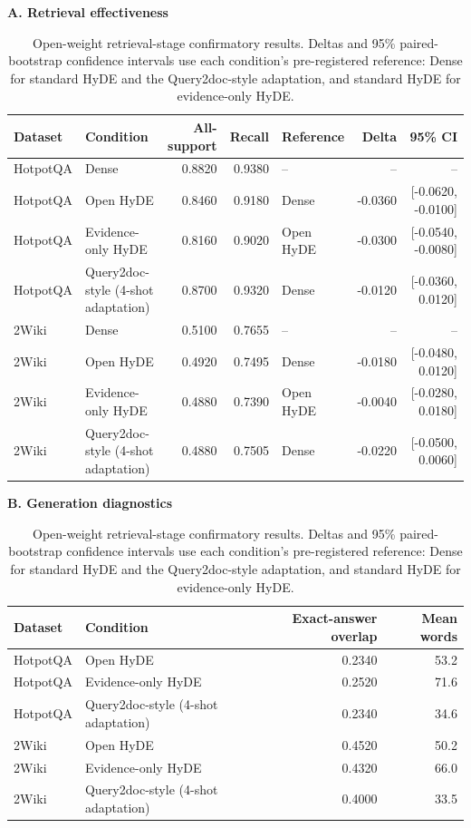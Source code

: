 \begin{table}[t]
\centering
\caption{Open-weight retrieval-stage confirmatory results. Deltas and 95\% paired-bootstrap confidence intervals use each condition's pre-registered reference: Dense for standard HyDE and the Query2doc-style adaptation, and standard HyDE for evidence-only HyDE.}
\label{tab:open_generator_query2doc}
\scriptsize
\setlength{\tabcolsep}{3.0pt}
\textbf{A. Retrieval effectiveness}\par\smallskip
\begin{tabularx}{\textwidth}{l>{\raggedright\arraybackslash}Xrrlrr}
\toprule
Dataset & Condition & All-support & Recall & Reference & Delta & 95\% CI \\
\midrule
HotpotQA & Dense & 0.8820 & 0.9380 & -- & -- & -- \\
HotpotQA & Open HyDE & 0.8460 & 0.9180 & Dense & -0.0360 & [-0.0620, -0.0100] \\
HotpotQA & Evidence-only HyDE & 0.8160 & 0.9020 & Open HyDE & -0.0300 & [-0.0540, -0.0080] \\
HotpotQA & Query2doc-style (4-shot adaptation) & 0.8700 & 0.9320 & Dense & -0.0120 & [-0.0360, 0.0120] \\
\midrule
2Wiki & Dense & 0.5100 & 0.7655 & -- & -- & -- \\
2Wiki & Open HyDE & 0.4920 & 0.7495 & Dense & -0.0180 & [-0.0480, 0.0120] \\
2Wiki & Evidence-only HyDE & 0.4880 & 0.7390 & Open HyDE & -0.0040 & [-0.0280, 0.0180] \\
2Wiki & Query2doc-style (4-shot adaptation) & 0.4880 & 0.7505 & Dense & -0.0220 & [-0.0500, 0.0060] \\
\bottomrule
\end{tabularx}
\par\medskip
\textbf{B. Generation diagnostics}\par\smallskip
\begin{tabular}{llrr}
\toprule
Dataset & Condition & Exact-answer overlap & Mean words \\
\midrule
HotpotQA & Open HyDE & 0.2340 & 53.2 \\
HotpotQA & Evidence-only HyDE & 0.2520 & 71.6 \\
HotpotQA & Query2doc-style (4-shot adaptation) & 0.2340 & 34.6 \\
\midrule
2Wiki & Open HyDE & 0.4520 & 50.2 \\
2Wiki & Evidence-only HyDE & 0.4320 & 66.0 \\
2Wiki & Query2doc-style (4-shot adaptation) & 0.4000 & 33.5 \\
\bottomrule
\end{tabular}
\end{table}
